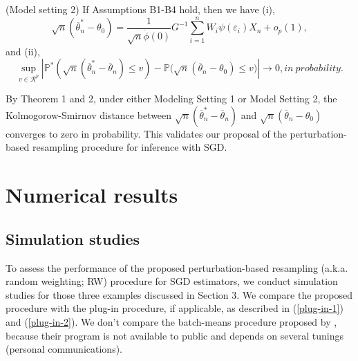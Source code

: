 \documentclass[12pt]{article}
\def\ol{\overline}
\begin{document}
{\Theorem (Model setting 2) If Assumptions B1-B4 hold,  then we have (i),
\begin{equation}\label{eq-th1}
\sqrt{n}(\ol{\theta}_n^*-\theta_0)=\frac{1}{\sqrt{n}\dot{\phi}(0)}G^{-1}\sum_{i=1}^n W_i \psi(\varepsilon_i)X_n+o_p(1),
\end{equation}
and (ii),
\begin{equation}\label{eq-co}
\sup_{v\in\mathcal{R}^p}\left|\mathbb{P}^*\left(\sqrt{n}(\ol{\theta}^*_n-\ol{\theta}_n)\leq v\right)-\mathbb{P}\Big(\sqrt{n}(\ol{\theta}_n-\theta_0)\leq v\Big)\right| \rightarrow 0, { in\ probability. }
\end{equation}
}

By Theorem 1 and 2, under either Modeling Setting 1 or Model Setting 2, the Kolmogorow-Smirnov distance between $\sqrt{n}(\ol{\theta}^*_n-\ol{\theta}_n)$ and $\sqrt{n}(\ol{\theta}_n-\theta_0)$ converges to zero in probability. This validates our proposal of the perturbation-based resampling procedure for inference with SGD.

\section{Numerical results}

\subsection{Simulation studies}

To assess the performance of the proposed perturbation-based resampling (a.k.a. random weighting; RW) procedure for SGD estimators, we conduct simulation studies for those three examples discussed in Section 3. We compare the proposed procedure with the plug-in procedure, if applicable, as described in (\ref{plug-in-1}) and (\ref{plug-in-2}). We don't compare the batch-means procedure proposed by \cite{chen2016statistical}, because their program is not available to public and depends on several tunings (personal communications).
\end{document}
